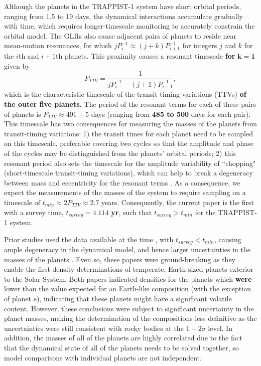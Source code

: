 \documentclass[twocolumn]{aastex63}
\begin{document}
Although the planets in the TRAPPIST-1 system have short orbital periods, ranging from
1.5 to 19 days, the dynamical interactions accumulate gradually with time, which requires
longer-timescale monitoring to accurately constrain the orbital model.
The GLRs also cause adjacent pairs of planets to reside near mean-motion resonances,
for which $j P_i^{-1} \approx (j+k) P_{i+1}^{-1}$ for integers $j$ and $k$ for the $i$th and $i+1$th planets.  This proximity causes a resonant timescale \textbf{for} $\mathbf{k=1}$
given by
\begin{equation}
    P_{TTV} = \frac{1}{j P_i^{-1} - (j+1) P_{i+1}^{-1}},
\end{equation}
\citep{Lithwick2012} which is the characteristic timescale of the transit timing variations (TTVs) \textbf{of
the outer five planets.}
The period of the resonant terms for each of these pairs of planets is $P_{TTV} \approx 491{\pm}5$
days (ranging from \textbf{485 to 500} days for each pair).  This timescale has two consequences for
measuring the masses of the planets from transit-timing variations:  1)  the transit times
for each planet need to be sampled on this timescale, preferable covering two cycles so that
the amplitude and phase of the cycles may be distinguished from the planets' orbital periods;
2) this resonant period also sets the timescale for the amplitude variability of ``chopping" (short-timescale
transit-timing variations), which can help to break a degeneracy between mass and eccentricity for the resonant terms
\citep{Lithwick2012,Deck2015}.  As a consequence, we expect the measurements of the masses
of the system to require sampling on a timescale of $t_{min} \approx 2 P_{TTV} \approx 2.7$ years.
Consequently, the current paper is the first with a survey time, $t_{survey} \mathbf{= 4.114}$ \textbf{yr}, such that $t_{survey} {>} t_{min}$ for the TRAPPIST-1 system.

Prior studies used the data available at the time \citep{Delrez2018a}, with $t_{survey} {<} t_{min}$, causing ample
degeneracy in the dynamical model, and hence larger uncertainties in the masses of the planets
\citep{Gillon2017,Grimm2018}.  Even so, these papers were ground-breaking as they enable the
first density determinations of temperate, Earth-sized planets exterior to the Solar System.
Both papers indicated densities for the planets which \textbf{were} lower than the value expected for
an Earth-like composition (with the exception of planet e), indicating that these planets might
have a significant volatile content.  However, these conclusions were subject to significant
uncertainty in the planet masses, making the determination of the compositions less definitive as the uncertainties were still consistent with rocky bodies at the $1-2\sigma$ level.
In addition, the masses of all of the planets are highly correlated due to the fact that the
dynamical state of all of the planets needs to be solved together, so model comparisons with individual planets
are not independent.
\end{document}
